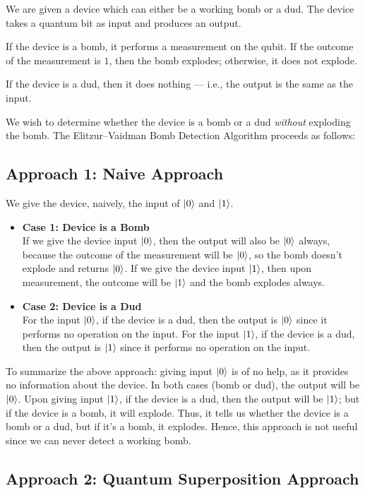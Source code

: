 We are given a device which can either be a working bomb or a dud. The device takes a quantum bit as input and produces an output.

If the device is a bomb, it performs a measurement on the qubit. If the outcome of the measurement is $1$, then the bomb explodes; otherwise, it does not explode.

If the device is a dud, then it does nothing — i.e., the output is the same as the input.

We wish to determine whether the device is a bomb or a dud \emph{without} exploding the bomb. The Elitzur–Vaidman Bomb Detection Algorithm proceeds as follows:

\subsection{Approach 1: Naive Approach}

We give the device, naively, the input of $\ket{0}$ and $\ket{1}$.
\begin{itemize} 
    \item \textbf{Case 1: Device is a Bomb} \\
    If we give the device input $\ket{0}$, then the output will also be $\ket{0}$ always, because the outcome of the measurement will be $\ket{0}$, so the bomb doesn't explode and returns $\ket{0}$.  
    If we give the device input $\ket{1}$, then upon measurement, the outcome will be $\ket{1}$ and the bomb explodes always.

    \item \textbf{Case 2: Device is a Dud} \\
    For the input $\ket{0}$, if the device is a dud, then the output is $\ket{0}$ since it performs no operation on the input.  
    For the input $\ket{1}$, if the device is a dud, then the output is $\ket{1}$ since it performs no operation on the input.
\end{itemize}

To summarize the above approach: giving input $\ket{0}$ is of no help, as it provides no information about the device. In both cases (bomb or dud), the output will be $\ket{0}$.  
Upon giving input $\ket{1}$, if the device is a dud, then the output will be $\ket{1}$; but if the device is a bomb, it will explode. Thus, it tells us whether the device is a bomb or a dud, but if it's a bomb, it explodes. Hence, this approach is not useful since we can never detect a working bomb.

\subsection{Approach 2: Quantum Superposition Approach}

